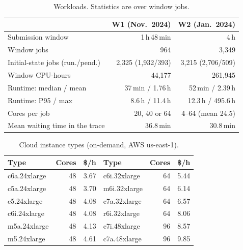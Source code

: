 \documentclass[conference]{IEEEtran}
\begin{document}
\begin{table}[t]
  \centering\footnotesize
  \setlength{\tabcolsep}{4pt}
  \caption{Workloads. Statistics are over window jobs.}
  \label{tab:workloads}
  \begin{tabular}{lrr}
    \toprule
                                        & W1 (Nov.~2024) & W2 (Jan.~2024) \\
    \midrule
    Submission window                   & 1\,h\,48\,min & 4\,h \\
    Window jobs                         & 964        & 3{,}349 \\
    Initial-state jobs (run./pend.)     & 2{,}325 (1{,}932/393) & 3{,}215 (2{,}706/509) \\
    Window CPU-hours                    & 44{,}177   & 261{,}945 \\
    Runtime: median / mean              & 37\,min / 1.76\,h & 52\,min / 2.39\,h \\
    Runtime: P95 / max                  & 8.6\,h / 11.4\,h  & 12.3\,h / 495.6\,h \\
    Cores per job                       & 20, 40 or 64 & 4--64 (mean 24.5) \\
    Mean waiting time in the trace      & 36.8\,min  & 30.8\,min \\
    \bottomrule
  \end{tabular}
\end{table}

\begin{table}[t]
  \centering\footnotesize
  \setlength{\tabcolsep}{3pt}
  \caption{Cloud instance types (on-demand, AWS us-east-1).}
  \label{tab:cloud}
  \begin{tabular}{lrr@{\quad}lrr}
    \toprule
    Type & Cores & \$/h & Type & Cores & \$/h \\
    \midrule
    c6a.24xlarge & 48 & 3.67 & c6i.32xlarge & 64 & 5.44 \\
    c5a.24xlarge & 48 & 3.70 & m6i.32xlarge & 64 & 6.14 \\
    c5.24xlarge  & 48 & 4.08 & c7a.32xlarge & 64 & 6.57 \\
    c6i.24xlarge & 48 & 4.08 & r6i.32xlarge & 64 & 8.06 \\
    m5a.24xlarge & 48 & 4.13 & c7i.48xlarge & 96 & 8.57 \\
    m5.24xlarge  & 48 & 4.61 & c7a.48xlarge & 96 & 9.85 \\
    \bottomrule
  \end{tabular}
\end{table}
\end{document}
